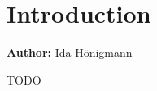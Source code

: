 \documentclass[../main.tex]{subfiles}
\begin{document}
\section{Introduction}
\textbf{Author:} Ida Hönigmann

\vspace{2mm}
TODO

\newpage
\end{document}
